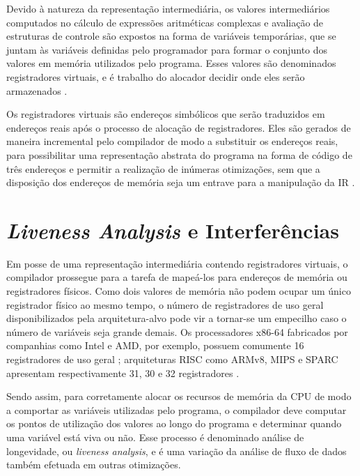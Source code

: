 \documentclass[
	12pt,				%
	openright,			%
	twoside,			%
	a4paper,			%
	tcc,			%
	]{ABNT-DC-UEL}
\begin{document}
Devido à natureza da representação intermediária, os valores intermediários computados no cálculo de expressões aritméticas complexas e avaliação de estruturas de controle são expostos na forma de variáveis temporárias, que se juntam às variáveis definidas pelo programador para formar o conjunto dos valores em memória utilizados pelo programa. Esses valores são denominados registradores virtuais, e é trabalho do alocador decidir onde eles serão armazenados \cite{muchnick:97}.

Os registradores virtuais são endereços simbólicos que serão traduzidos em endereços reais após o processo de alocação de registradores. Eles são gerados de maneira incremental pelo compilador de modo a substituir os endereços reais, para possibilitar uma representação abstrata do programa na forma de código de três endereços e permitir a realização de inúmeras otimizações, sem que a disposição dos endereços de memória seja um entrave para a manipulação da IR \cite{muchnick:97}.

\section{\textit{Liveness Analysis} e Interferências}

Em posse de uma representação intermediária contendo registradores virtuais, o compilador prossegue para a tarefa de mapeá-los para endereços de memória ou registradores físicos. Como dois valores de memória não podem ocupar um único registrador físico ao mesmo tempo, o número de registradores de uso geral disponibilizados pela arquitetura-alvo pode vir a tornar-se um empecilho caso o número de variáveis seja grande demais. Os processadores x86-64 fabricados por companhias como Intel e AMD, por exemplo, possuem comumente 16 registradores de uso geral \cite{amd:06}; arquiteturas RISC como ARMv8, MIPS e SPARC apresentam respectivamente 31, 30 e 32 registradores \cite{elkady:14}.

Sendo assim, para corretamente alocar os recursos de memória da CPU de modo a comportar as variáveis utilizadas pelo programa, o compilador deve computar os pontos de utilização dos valores ao longo do programa e determinar quando uma variável está viva ou não. Esse processo é denominado análise de longevidade, ou \textit{liveness analysis}, e é uma variação da análise de fluxo de dados também efetuada em outras otimizações. 
\end{document}

